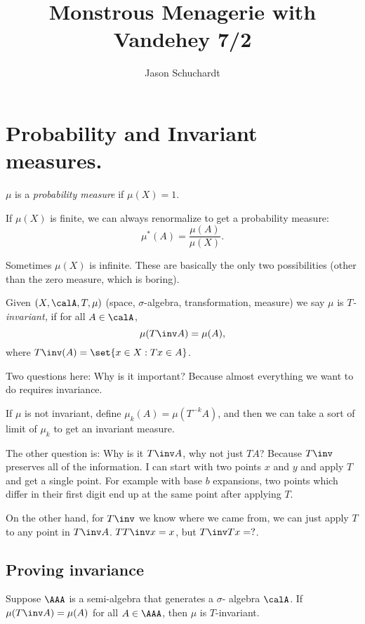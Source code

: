 \documentclass{article}
\title{Monstrous Menagerie with Vandehey 7/2}
\author{Jason Schuchardt}
\begin{document}
\maketitle

\section{Probability and Invariant measures.}

\begin{definition}
    $\mu$ is a \emph{probability measure} if $\mu(X)=1$.
\end{definition}

If $\mu(X)$ is finite, we can always renormalize to get a
probability measure:
\[ \mu^*(A) = \frac{\mu(A)}{\mu(X)}. \]

Sometimes $\mu(X)$ is infinite. These are basically the only two
possibilities (other than the zero measure, which is boring).

\begin{definition}
Given $(X,\calA,T,\mu)$ 
(space, $\sigma$-algebra, transformation, measure)
we say $\mu$ is \emph{$T$-invariant,} if 
for all $A\in \calA$, 
\[\mu(T\inv A)=\mu(A),\]
where $T\inv(A) = \set{x\in X : Tx\in A}$.
\end{definition}

Two questions here: Why is it important? Because almost 
everything we want to do requires invariance.

If $\mu$ is not invariant,
define $\mu_k(A) = \mu(T^{-k}A)$,
and then we can take a sort of limit of $\mu_k$ to get an
invariant measure.

The other question is: Why is it $T\inv A$, why not just
$TA$? Because $T\inv$ preserves all of the information.
I can start with two points $x$ and $y$ and apply $T$ and
get a single point. For example with base $b$ expansions,
two points which differ in their first digit end up at the 
same point after applying $T$.

On the other hand, for $T\inv$ we know where we came from,
we can just apply $T$ to any point in $T\inv A$.
$TT\inv x = x$, but $T\inv T x = ?$.

\subsection{Proving invariance}

\begin{theorem}
    Suppose $\AAA$ is a semi-algebra that generates a $\sigma$-
    algebra $\calA$. If $\mu(T\inv A) = \mu(A)$ for all
    $A\in\AAA$, then $\mu$ is $T$-invariant.
\end{theorem}
\end{document}

